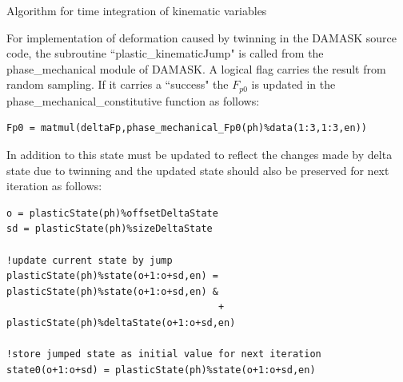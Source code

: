 \begin{algorithm}[H]
\caption{Algorithm for time integration of kinematic variables}
\label{alg:myalgorithm}




\end{algorithm}


For implementation of deformation caused by twinning in the DAMASK source code, the subroutine ``plastic\_kinematicJump" is called from the phase\_mechanical module of DAMASK. A logical flag carries the result from random sampling. If it carries a ``success" the $F_{p0}$ is updated in the phase\_mechanical\_constitutive function as follows:

\begin{verbatim}
Fp0 = matmul(deltaFp,phase_mechanical_Fp0(ph)%data(1:3,1:3,en))
\end{verbatim}

In addition to this state must be updated to reflect the changes made by delta state due to twinning and the updated state should also be preserved for next iteration as follows:
\begin{verbatim}
o = plasticState(ph)%offsetDeltaState
sd = plasticState(ph)%sizeDeltaState
      
!update current state by jump
plasticState(ph)%state(o+1:o+sd,en) = plasticState(ph)%state(o+1:o+sd,en) & 
                                     + plasticState(ph)%deltaState(o+1:o+sd,en)
      
!store jumped state as initial value for next iteration
state0(o+1:o+sd) = plasticState(ph)%state(o+1:o+sd,en)
\end{verbatim}

